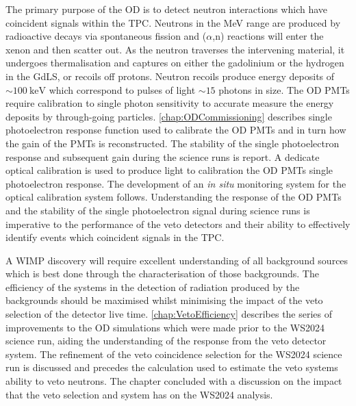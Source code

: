 The primary purpose of the OD is to detect neutron interactions which have coincident signals within the TPC. Neutrons in the MeV range are produced by radioactive decays via spontaneous fission and ($\alpha$,n) reactions will enter the xenon and then scatter out. As the neutron traverses the intervening material, it undergoes thermalisation and captures on either the gadolinium or the hydrogen in the GdLS, or recoils off protons. Neutron recoils produce energy deposits of $\sim100~\text{keV}$ which correspond to pulses of light $\sim15$ photons in size. The OD PMTs require calibration to single photon sensitivity to accurate measure the energy deposits by through-going particles. \autoref{chap:ODCommissioning} describes single photoelectron response function used to calibrate the OD PMTs and in turn how the gain of the PMTs is reconstructed. The stability of the single photoelectron response and subsequent gain during the science runs is report. A dedicate optical calibration is used to produce light to calibration the OD PMTs single photoelectron response. The development of an \textit{in situ} monitoring system for the optical calibration system follows. Understanding the response of the OD PMTs and the stability of the single photoelectron signal during science runs is imperative to the performance of the veto detectors and their ability to effectively identify events which coincident signals in the TPC.

A WIMP discovery will require excellent understanding of all background sources which is best done through the characterisation of those backgrounds. The efficiency of the systems in the detection of radiation produced by the backgrounds should be maximised whilst minimising the impact of the veto selection of the detector live time. \autoref{chap:VetoEfficiency} describes the series of improvements to the OD simulations which were made prior to the WS2024 science run, aiding the understanding of the response from the veto detector system. The refinement of the veto coincidence selection for the WS2024 science run is discussed and precedes the calculation used to estimate the veto systems ability to veto neutrons. The chapter concluded with a discussion on the impact that the veto selection and system has on the WS2024 analysis. 

